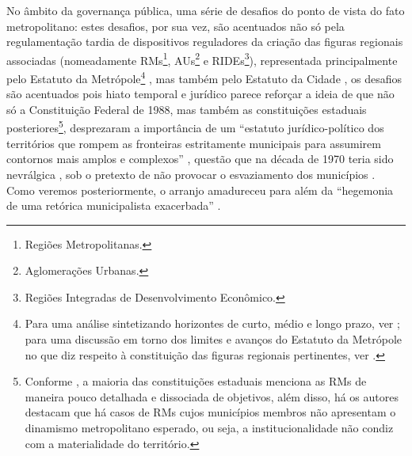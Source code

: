 \documentclass[
article,			%
11pt,				%
oneside,			%
a4paper,			%
english,			%
brazil,				%
sumario=tradicional
]{abntex2}
\begin{document}
	No âmbito da governança pública, uma série de desafios do ponto de vista do fato metropolitano: estes desafios, por sua vez, são acentuados não só pela regulamentação tardia de dispositivos reguladores da criação das figuras regionais associadas (nomeadamente RMs\footnote{Regiões Metropolitanas.}, AUs\footnote{Aglomerações Urbanas.} e RIDEs\footnote{Regiões Integradas de Desenvolvimento Econômico.}), representada principalmente pelo Estatuto da Metrópole\footnote{Para uma análise sintetizando horizontes de curto, médio e longo prazo, ver ; para uma discussão em torno dos limites e avanços do Estatuto da Metrópole no que diz respeito à constituição das figuras regionais pertinentes, ver .} \cite{brasil2015a}, mas também pelo Estatuto da Cidade \cite{brasil2001a}, os desafios são acentuados pois hiato temporal e jurídico parece reforçar a ideia de que não só a Constituição Federal de 1988, mas também as constituições estaduais posteriores\footnote{Conforme , a maioria das constituições estaduais menciona as RMs de maneira pouco detalhada e dissociada de objetivos, além disso, há os autores destacam que há casos de RMs cujos municípios membros não apresentam o dinamismo metropolitano esperado, ou seja, a institucionalidade não condiz com a materialidade do território.}, desprezaram a importância de um ``estatuto jurídico-político dos territórios que rompem as fronteiras estritamente municipais para assumirem contornos mais amplos e complexos'' \cite[p. 69]{souza2015a}, questão que na década de 1970 teria sido nevrálgica \cite[p. 69]{souza2015a}, sob o pretexto de não provocar o esvaziamento dos municípios \cite[p. 101]{guia2015a}. Como veremos posteriormente, o arranjo amadureceu para além da ``hegemonia de uma retórica municipalista exacerbada'' \cite[p. 106]{guia2015a}.
	
\end{document}
